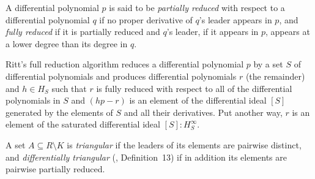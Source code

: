 \documentclass{article}
\theoremstyle{definition}
\theoremstyle{plain}
\begin{document}
A differential polynomial $p$ is said to be {\it partially reduced} with respect to a differential polynomial $q$ if
no proper derivative of $q$'s leader appears in $p$, and {\it fully reduced} if it is partially reduced and
$q$'s leader, if it appears in $p$, appears at a lower degree than its degree in $q$.


Ritt's full reduction algorithm reduces a differential polynomial $p$ by a set $S$ of differential polynomials
and produces differential polynomials $r$ (the remainder) and $h \in H_S$
such that $r$ is fully reduced with respect to all of the differential polynomials in $S$
and $(hp - r)$ is an element of the differential ideal $[S]$ generated by the elements of $S$ and all their derivatives.
Put another way, $r$ is an element of the saturated differential ideal $[S]:H_S^\infty$.

\smallskip
A set $A \subseteq R \setminus K$ is {\it triangular} if the leaders of its
elements are pairwise distinct, and {\it differentially triangular}
(\cite{blop}, Definition~13) if in addition its elements are pairwise
partially reduced.
\end{document}
